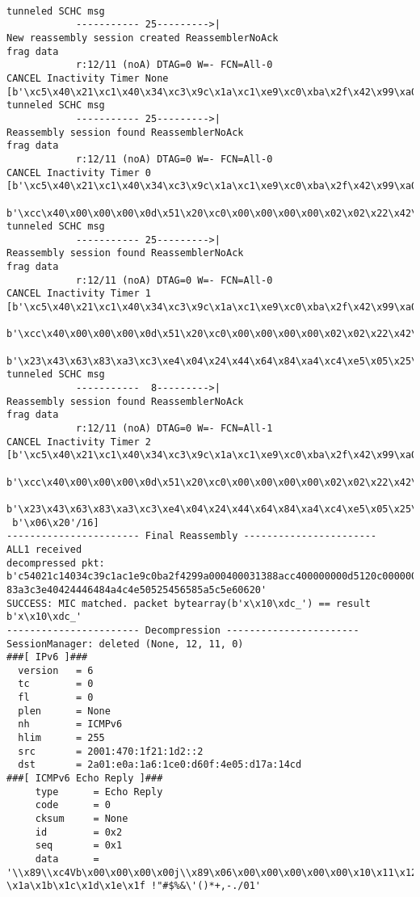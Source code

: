 \begin{lstlisting}[basicstyle=\ttfamily\tiny, numbers=none]

tunneled SCHC msg
			----------- 25--------->|
New reassembly session created ReassemblerNoAck
frag data
			r:12/11 (noA) DTAG=0 W=- FCN=All-0
CANCEL Inactivity Timer None
[b'\xc5\x40\x21\xc1\x40\x34\xc3\x9c\x1a\xc1\xe9\xc0\xba\x2f\x42\x99\xa0\x00\x40\x00\x31\x38\x8a'/184]
tunneled SCHC msg
			----------- 25--------->|
Reassembly session found ReassemblerNoAck
frag data
			r:12/11 (noA) DTAG=0 W=- FCN=All-0
CANCEL Inactivity Timer 0
[b'\xc5\x40\x21\xc1\x40\x34\xc3\x9c\x1a\xc1\xe9\xc0\xba\x2f\x42\x99\xa0\x00\x40\x00\x31\x38\x8a'/184, 
 b'\xcc\x40\x00\x00\x00\x0d\x51\x20\xc0\x00\x00\x00\x00\x02\x02\x22\x42\x62\x82\xa2\xc2\xe3\x03'/184]
tunneled SCHC msg
			----------- 25--------->|
Reassembly session found ReassemblerNoAck
frag data
			r:12/11 (noA) DTAG=0 W=- FCN=All-0
CANCEL Inactivity Timer 1
[b'\xc5\x40\x21\xc1\x40\x34\xc3\x9c\x1a\xc1\xe9\xc0\xba\x2f\x42\x99\xa0\x00\x40\x00\x31\x38\x8a'/184, 
 b'\xcc\x40\x00\x00\x00\x0d\x51\x20\xc0\x00\x00\x00\x00\x02\x02\x22\x42\x62\x82\xa2\xc2\xe3\x03'/184, 
 b'\x23\x43\x63\x83\xa3\xc3\xe4\x04\x24\x44\x64\x84\xa4\xc4\xe5\x05\x25\x45\x65\x85\xa5\xc5\xe6'/184]
tunneled SCHC msg
			-----------  8--------->|
Reassembly session found ReassemblerNoAck
frag data
			r:12/11 (noA) DTAG=0 W=- FCN=All-1
CANCEL Inactivity Timer 2
[b'\xc5\x40\x21\xc1\x40\x34\xc3\x9c\x1a\xc1\xe9\xc0\xba\x2f\x42\x99\xa0\x00\x40\x00\x31\x38\x8a'/184, 
 b'\xcc\x40\x00\x00\x00\x0d\x51\x20\xc0\x00\x00\x00\x00\x02\x02\x22\x42\x62\x82\xa2\xc2\xe3\x03'/184, 
 b'\x23\x43\x63\x83\xa3\xc3\xe4\x04\x24\x44\x64\x84\xa4\xc4\xe5\x05\x25\x45\x65\x85\xa5\xc5\xe6'/184, 
 b'\x06\x20'/16]
----------------------- Final Reassembly -----------------------
ALL1 received
decompressed pkt: b'c54021c14034c39c1ac1e9c0ba2f4299a000400031388acc400000000d5120c000000000020222426282a2c2e303234363
83a3c3e40424446484a4c4e50525456585a5c5e60620'
SUCCESS: MIC matched. packet bytearray(b'x\x10\xdc_') == result b'x\x10\xdc_'
----------------------- Decompression -----------------------
SessionManager: deleted (None, 12, 11, 0)
###[ IPv6 ]### 
  version   = 6
  tc        = 0
  fl        = 0
  plen      = None
  nh        = ICMPv6
  hlim      = 255
  src       = 2001:470:1f21:1d2::2
  dst       = 2a01:e0a:1a6:1ce0:d60f:4e05:d17a:14cd
###[ ICMPv6 Echo Reply ]### 
     type      = Echo Reply
     code      = 0
     cksum     = None
     id        = 0x2
     seq       = 0x1
     data      = '\\x89\\xc4Vb\x00\x00\x00\x00j\\x89\x06\x00\x00\x00\x00\x00\x10\x11\x12\x13\x14\x15\x16\x17\x18\x19
\x1a\x1b\x1c\x1d\x1e\x1f !"#$%&\'()*+,-./01'


\end{lstlisting}
